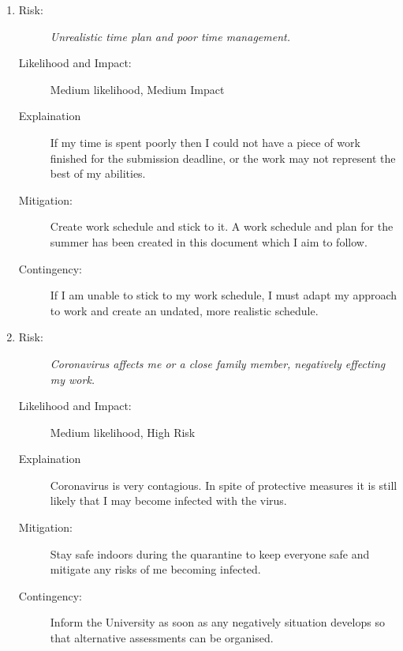 \documentclass{article}
\begin{document}
\begin{enumerate}
    \item 
    \begin{description}
        \item[Risk:]    
        \emph{Unrealistic time plan and poor time management.}
        \item[Likelihood and Impact:]
        Medium likelihood, Medium Impact
        \item[Explaination]
        If my time is spent poorly then I could not have a piece of work finished for the submission deadline, or the work may not represent the best of my abilities.  
        \item[Mitigation:]
        Create work schedule and stick to it.
        A work schedule and plan for the summer has been created in this document which I aim to follow.
        \item[Contingency:]
        If I am unable to stick to my work schedule, I must adapt my approach to work and create an undated, more realistic schedule.
    \end{description}

    \item 
    \begin{description}
        \item[Risk:]
        \emph{Coronavirus affects me or a close family member, negatively effecting my work.}
        \item[Likelihood and Impact:]
        Medium likelihood, High Risk
        \item[Explaination]
        Coronavirus is very contagious. 
        In spite of protective measures it is still likely that I may become infected with the virus. 
        \item[Mitigation:]
        Stay safe indoors during the quarantine to keep everyone safe and mitigate any risks of me becoming infected.
        \item[Contingency:]
        Inform the University as soon as any negatively situation develops so that alternative assessments can be organised.
    \end{description}


\end{enumerate}
\end{document}
